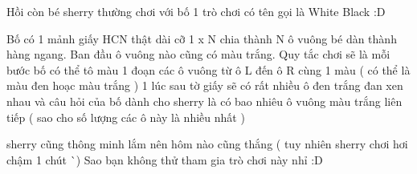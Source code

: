 Hồi còn bé sherry thường chơi với bố 1 trò chơi có tên gọi là White Black :D  

   Bố có 1 mảnh giấy HCN thật dài cỡ 1 x N chia thành N ô vuông bé dàn thành hàng ngang. Ban đầu ô vuông nào cũng có màu trắng. Quy tắc chơi sẽ là mỗi bước bố có thể tô màu 1 đoạn các ô vuông từ ô L đến ô R cùng 1 màu ( có thể là màu đen hoạc màu trắng ) 1 lúc sau tờ giấy sẽ có rất nhiều ô đen trắng đan xen nhau và câu hỏi của bố dành cho sherry là có bao nhiêu ô vuông màu trắng liên tiếp ( sao cho số lượng các ô này là nhiều nhất )  

   sherry cũng thông minh lắm nên hôm nào cũng thắng ( tuy nhiên sherry chơi hơi chậm 1 chút ^^ ) Sao bạn không thử tham gia trò chơi này nhỉ :D